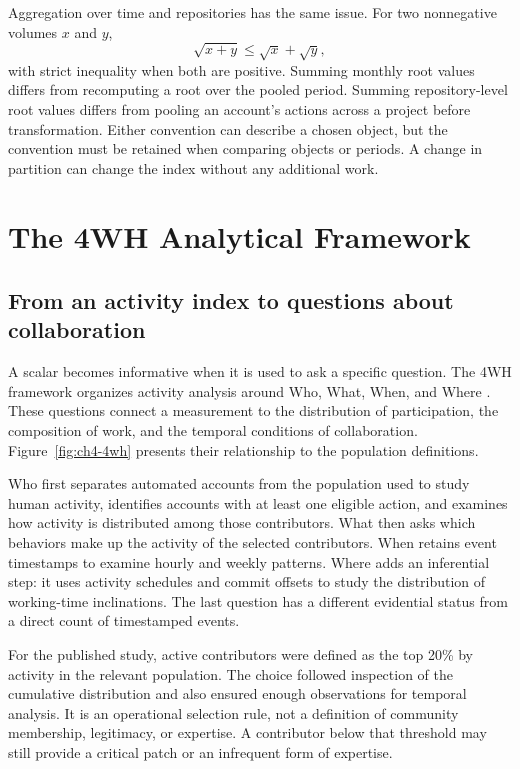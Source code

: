 Aggregation over time and repositories has the same issue. For two nonnegative volumes \(x\) and \(y\),
\begin{equation}
\sqrt{x+y}\leq\sqrt{x}+\sqrt{y},
\label{eq:ch4-partition}
\end{equation}
with strict inequality when both are positive. Summing monthly root values differs from recomputing a root over the pooled period. Summing repository-level root values differs from pooling an account's actions across a project before transformation. Either convention can describe a chosen object, but the convention must be retained when comparing objects or periods. A change in partition can change the index without any additional work.

\section{The 4WH Analytical Framework}
\label{sec:ch4-framework}

\subsection{From an activity index to questions about collaboration}
A scalar becomes informative when it is used to ask a specific question. The 4WH framework organizes activity analysis around Who, What, When, and Where \citep{xia2022,xia2024thesis}. These questions connect a measurement to the distribution of participation, the composition of work, and the temporal conditions of collaboration. Figure~\ref{fig:ch4-4wh} presents their relationship to the population definitions.



Who first separates automated accounts from the population used to study human activity, identifies accounts with at least one eligible action, and examines how activity is distributed among those contributors. What then asks which behaviors make up the activity of the selected contributors. When retains event timestamps to examine hourly and weekly patterns. Where adds an inferential step: it uses activity schedules and commit offsets to study the distribution of working-time inclinations. The last question has a different evidential status from a direct count of timestamped events.

For the published study, active contributors were defined as the top 20\% by activity in the relevant population. The choice followed inspection of the cumulative distribution and also ensured enough observations for temporal analysis. It is an operational selection rule, not a definition of community membership, legitimacy, or expertise. A contributor below that threshold may still provide a critical patch or an infrequent form of expertise.

